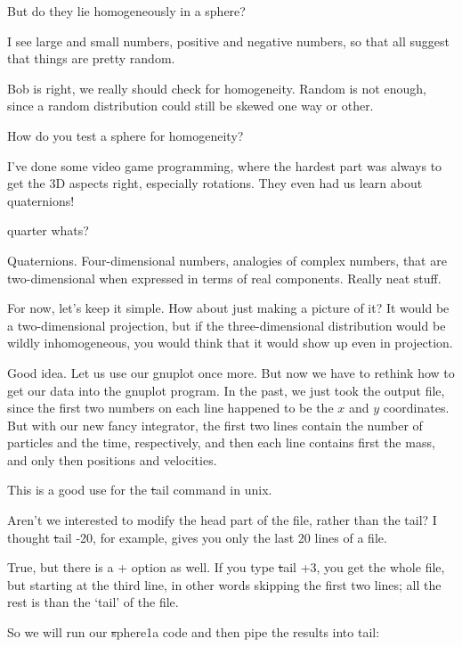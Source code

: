 \bob
But do they lie homogeneously in a sphere?

\carol
I see large and small numbers, positive and negative numbers, so that
all suggest that things are pretty random.

\alice
Bob is right, we really should check for homogeneity.  Random is not
enough, since a random distribution could still be skewed one way or
other.

\bob
How do you test a sphere for homogeneity?

\carol
I've done some video game programming, where the hardest part was
always to get the 3D aspects right, especially rotations.  They even
had us learn about quaternions!

\bob
quarter whats?

\carol
Quaternions.  Four-dimensional numbers, analogies of complex numbers,
that are two-dimensional when expressed in terms of real components.
Really neat stuff.  

\bob
For now, let's keep it simple.  How about just making a picture of it?
It would be a two-dimensional projection, but if the three-dimensional
distribution would be wildly inhomogeneous, you would think that it
would show up even in projection.

\alice
Good idea.  Let us use our gnuplot once more.  But now we have to
rethink how to get our data into the gnuplot program.  In the past, we
just took the output file, since the first two numbers on each line
happened to be the $x$ and $y$ coordinates.  But with our new fancy
integrator, the first two lines contain the number of particles and
the time, respectively, and then each line contains first the mass,
and only then positions and velocities.

\carol
This is a good use for the {\st tail} command in unix.

\bob
Aren't we interested to modify the head part of the file, rather than
the tail?  I thought {\st tail -20}, for example, gives you only the
last 20 lines of a file.

\carol
True, but there is a {+} option as well.  If you type {\st tail +3},
you get the whole file, but starting at the third line, in other words
skipping the first two lines; all the rest is than the `tail' of the
file.

\alice
So we will run our {\st sphere1a} code and then pipe the results into
tail:

\cba

